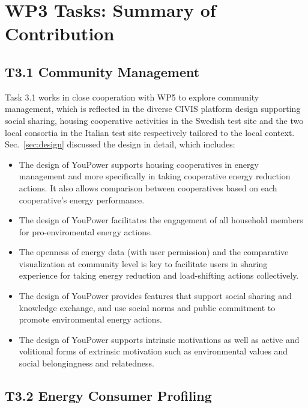\section{WP3 Tasks: Summary of Contribution}
\label{sec:tasks}

\subsection{T3.1 Community Management}

Task 3.1 works in close cooperation with WP5 to explore community management, which is reflected in the diverse CIVIS platform design supporting social sharing, housing cooperative activities in the Swedish test site and the two local consortia in the Italian test site respectively tailored to the local context. Sec.~\ref{sec:design} discussed the design in detail, which includes:   

\begin{itemize}
\item The design of YouPower supports housing cooperatives in energy management and more specifically in taking cooperative energy reduction actions. It also allows comparison between cooperatives based on each cooperative's energy performance. 

\item The design of YouPower facilitates the engagement of all household members for pro-enviromental energy actions. 

\item The openness of energy data (with user permission) and the comparative visualization  at community level is key to facilitate users in sharing experience for taking energy reduction and load-shifting actions collectively. 

\item The design of YouPower provides features that support social sharing and knowledge exchange, and use social norms and public commitment to promote environmental energy actions. 

\item The design of YouPower supports intrinsic motivations as well as active and volitional forms of extrinsic motivation such as environmental values and social belongingness and relatedness. 
\end{itemize}

\subsection{T3.2 Energy Consumer Profiling}


